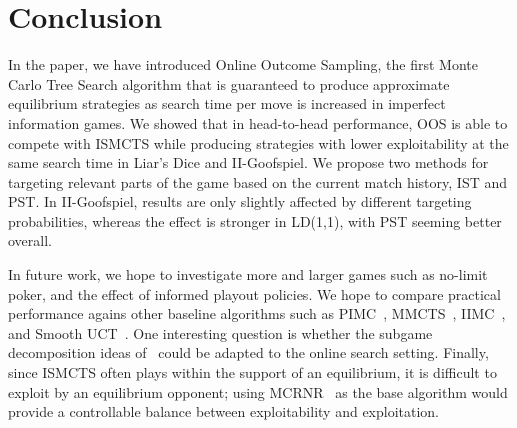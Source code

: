 \documentclass{aamas2015}
\newcounter{vlNoteCounter}
\newcommand{\vlnote}[1]{{\scriptsize \color{blue} $\blacksquare$ \refstepcounter{vlNoteCounter}\textsf{[VL]$_{\arabic{vlNoteCounter}}$:{#1}}}}
\begin{document}
\section{Conclusion}

In the paper, we have introduced Online Outcome Sampling, the first Monte Carlo 
Tree Search algorithm that is guaranteed to produce  
approximate equilibrium strategies as search time per move is increased in imperfect information games.
We showed that in head-to-head performance, OOS is able to compete with 
ISMCTS while producing strategies with lower exploitability
at the same search time in Liar's Dice and II-Goofspiel.
We propose two methods for targeting relevant parts of the game based on the current match history, 
IST and PST.
In II-Goofspiel, results are only slightly affected by different targeting probabilities, whereas the
effect is stronger in LD(1,1), with PST seeming better overall.

In future work, we hope to investigate more and larger games such as 
no-limit poker, and the effect of informed playout policies. 
We hope to compare practical performance agains other 
baseline algorithms such as 
PIMC~\cite{Long10Understanding}, MMCTS~\cite{Auger11Multiple}, IIMC~\cite{Furtak13Recursive}, and Smooth UCT~\cite{Heinrich14}.
One interesting question is whether the subgame decomposition ideas of~\cite{Burch14Solving,Jackson14} could be 
adapted to the online search setting. 
Finally, since ISMCTS often plays within the support of an equilibrium, it is difficult to exploit by an equilibrium opponent; 
using MCRNR~\cite{Ponsen11Computing} as the base algorithm would provide a controllable balance between exploitability and exploitation.



%

%
%
\end{document}

